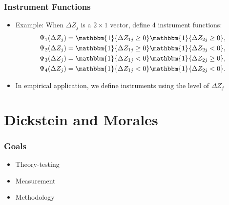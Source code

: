 \documentclass[10pt,letterpaper]{beamer}
\begin{document}
\begin{frame}
\frametitle{Instrument Functions}

\begin{itemize}
\item Example: When $\Delta Z_{j}$ is a $2\times 1$ vector, define 4
instrument functions:  
\begin{align*}
\Psi_{1}(\Delta Z_{j})&=\mathbbm{1}\{\Delta Z_{1j}\geq0\}\mathbbm{1}\{\Delta
Z_{2j}\geq0\}, \\
\Psi_{2}(\Delta Z_{j})&=\mathbbm{1}\{\Delta Z_{1j}\geq0\}\mathbbm{1}\{\Delta
Z_{2j}<0\}, \\
\Psi_{3}(\Delta Z_{j})&=\mathbbm{1}\{\Delta Z_{1j}<0\}\mathbbm{1}\{\Delta
Z_{2j}\geq0\}, \\
\Psi_{4}(\Delta Z_{j})&=\mathbbm{1}\{\Delta Z_{1j}<0\}\mathbbm{1}\{\Delta
Z_{2j}<0\}.
\end{align*}

\item In empirical application, we define instruments using the level of $%
\Delta Z_{j}$
\end{itemize}
\end{frame}




\section{Dickstein and Morales}

\begin{frame}
\frametitle{Goals}

\begin{itemize}
\item Theory-testing
\item Measurement
\item Methodology
\end{itemize}

\end{frame}
\end{document}
